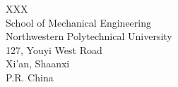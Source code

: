 \documentclass[12pt, a4paper]{letter} %
\begin{document}
\begin{letter}{
	XXX\\
	School of Mechanical Engineering\\
	Northwestern Polytechnical University\\
	127, Youyi West Road\\
	Xi'an, Shaanxi\\
	P.R. China\\
}



\end{letter}
\end{document}
